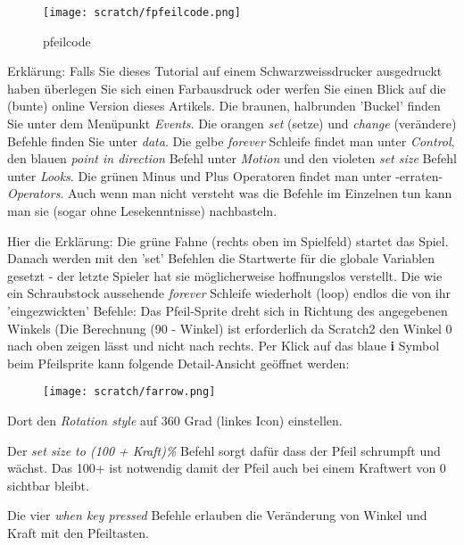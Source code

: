 \documentclass[10pt,a4paper,ngerman,twoside]{article} %
\begin{document}
\begin{figure}
\texttt{[image: scratch/fpfeilcode.png]}
\caption{pfeilcode}
\end{figure}

Erklärung: Falls Sie dieses Tutorial auf einem Schwarzweissdrucker ausgedruckt haben überlegen Sie sich einen Farbausdruck oder werfen Sie einen Blick auf die (bunte) online Version dieses Artikels. Die braunen, halbrunden 'Buckel' finden Sie unter dem Menüpunkt \textit{Events}. Die orangen \textit{set} (setze) und \textit{change} (verändere) Befehle finden Sie unter \textit{data}. Die gelbe \textit{forever} Schleife findet man unter \textit{Control}, den blauen \textit{point in direction} Befehl unter \textit{Motion} und den violeten \textit{set size} Befehl unter \textit{Looks}. Die grünen Minus und Plus Operatoren findet man unter -erraten- \textit{Operators}. Auch wenn man nicht versteht was die Befehle im Einzelnen tun kann man sie (sogar ohne Lesekenntnisse) nachbasteln. 

Hier die Erklärung: Die grüne Fahne (rechts oben im Spielfeld) startet das Spiel. Danach werden mit den 'set' Befehlen die Startwerte für die globale Variablen gesetzt - der letzte Spieler hat sie möglicherweise hoffnungslos verstellt. Die wie ein Schraubstock aussehende \textit{forever} Schleife wiederholt (loop) endlos die von ihr 'eingezwickten' Befehle: Das Pfeil-Sprite dreht sich in Richtung des angegebenen Winkels (Die Berechnung (90 - Winkel) ist erforderlich da Scratch2 den Winkel 0 nach oben zeigen lässt und nicht nach rechts. Per Klick auf das blaue \textbf{i} Symbol beim Pfeilsprite kann folgende Detail-Ansicht geöffnet werden: 

\begin{figure}
\texttt{[image: scratch/farrow.png]}
\end{figure}

Dort den \textit{Rotation style} auf 360 Grad (linkes Icon) einstellen.

Der \textit{set size to (100 + Kraft)\%} Befehl sorgt dafür dass der Pfeil schrumpft und wächst. Das 100+ ist notwendig damit der Pfeil auch bei einem Kraftwert von 0 sichtbar bleibt.

Die vier \textit{when key pressed} Befehle erlauben die Veränderung von Winkel und Kraft mit den Pfeiltasten.
\end{document}
